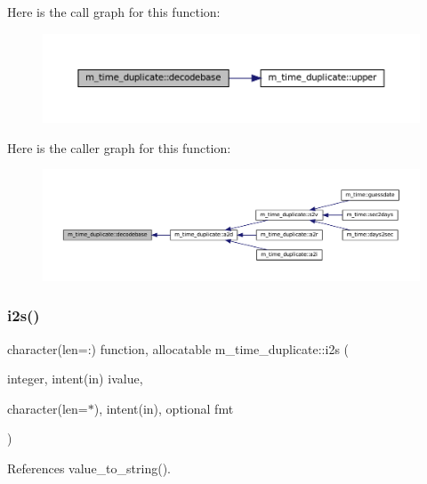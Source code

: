 Here is the call graph for this function\+:\nopagebreak
\begin{figure}[H]
\begin{center}
\leavevmode
\includegraphics[width=350pt]{namespacem__time__duplicate_a66a83a4b3d6324843c984658784b2c4e_cgraph}
\end{center}
\end{figure}
Here is the caller graph for this function\+:\nopagebreak
\begin{figure}[H]
\begin{center}
\leavevmode
\includegraphics[width=350pt]{namespacem__time__duplicate_a66a83a4b3d6324843c984658784b2c4e_icgraph}
\end{center}
\end{figure}
\mbox{\label{namespacem__time__duplicate_a7570c5a3b71c4ea4f376a38b285ccbd8}} 
\subsubsection{\texorpdfstring{i2s()}{i2s()}}
{\footnotesize\ttfamily character(len=\+:) function, allocatable m\+\_\+time\+\_\+duplicate\+::i2s (\begin{DoxyParamCaption}\item[{integer, intent(in)}]{ivalue,  }\item[{character(len=$\ast$), intent(in), optional}]{fmt }\end{DoxyParamCaption})}



References value\+\_\+to\+\_\+string().

